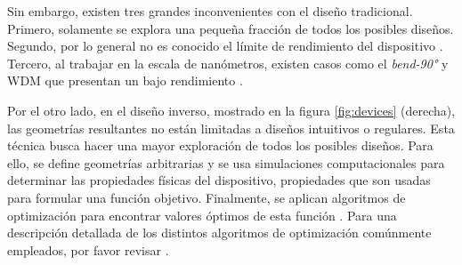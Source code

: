 Sin embargo, existen tres grandes inconvenientes con el diseño tradicional. 
Primero, solamente se explora una pequeña fracción de todos los posibles diseños.
Segundo, por lo general no es conocido el límite de rendimiento del dispositivo
\citep{Molesky2018}.
Tercero, al trabajar en la escala de nanómetros, existen casos como el
\emph{bend-90°} y WDM que presentan un bajo rendimiento \citep{Su2020}.



Por el otro lado, en el diseño inverso, mostrado en la figura \ref{fig:devices}
(derecha), las geometrías resultantes no están limitadas a diseños intuitivos o regulares.
Esta técnica busca hacer una mayor exploración de todos los posibles diseños.
Para ello, se define geometrías arbitrarias y se usa simulaciones
computacionales para determinar las propiedades físicas del dispositivo,
propiedades que son usadas para formular una función objetivo.
Finalmente, se aplican algoritmos de optimización para encontrar valores
óptimos de esta función \citep{Molesky2018, Su2020}.
Para una descripción detallada de los distintos algoritmos de optimización
comúnmente empleados, por favor revisar \cite{Schneider2019, Elsawy2020, Campbell2019}.


